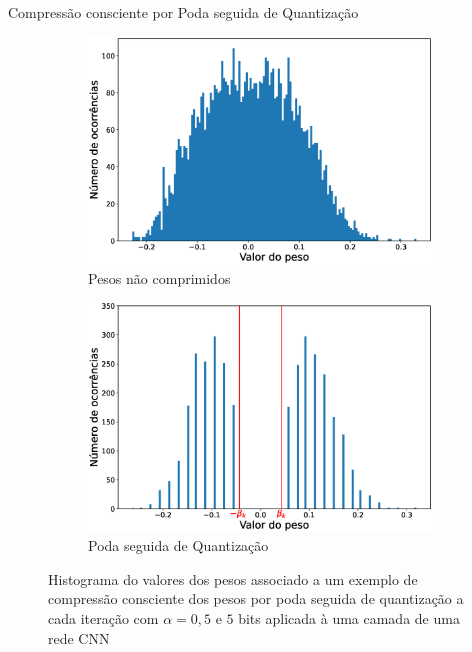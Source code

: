 \begin{frame}{Compressão consciente por Poda seguida de Quantização}
    \begin{figure}[H]
  \centering

  \begin{subfigure}[b]{0.49\textwidth}
    \includegraphics[width=\textwidth]{figuras/hist_weights.eps}
    \caption{Pesos não comprimidos}
    \label{fig:subfig1}
  \end{subfigure}
  \hfill
  \begin{subfigure}[b]{0.49\textwidth}
    \includegraphics[width=\textwidth]{figuras/hist_prunequant.eps}
    \caption{Poda seguida de Quantização}
    \label{fig:subfig2}
  \end{subfigure}

  \caption{Histograma do valores dos pesos associado a um exemplo de compressão consciente dos pesos por poda seguida de quantização a cada iteração com $\alpha=0,5$ e $5$ bits aplicada à uma camada de uma rede CNN}
  \label{fig:main}
\end{figure}
\end{frame}

